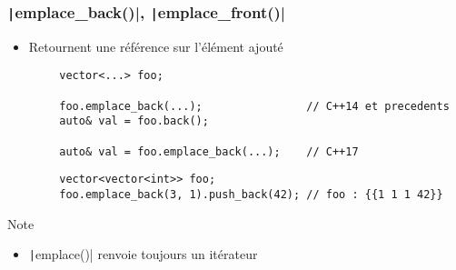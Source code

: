 \documentclass[C++.tex]{subfiles}
\begin{document}
\begin{frame}[fragile]
	\frametitle{\texttt|emplace_back()|, \texttt|emplace_front()|}
	\begin{itemize}
		\item Retournent une référence sur l'élément ajouté
	\end{itemize}

	\begin{verbatim}
		vector<...> foo;

		foo.emplace_back(...);                // C++14 et precedents
		auto& val = foo.back();

		auto& val = foo.emplace_back(...);    // C++17
	\end{verbatim}

	\begin{verbatim}
		vector<vector<int>> foo;
		foo.emplace_back(3, 1).push_back(42); // foo : {{1 1 1 42}}
	\end{verbatim}

	\begin{block}{Note}
		\begin{itemize}
			\item \texttt|emplace()| renvoie toujours un itérateur
		\end{itemize}
	\end{block}


\end{frame}
\end{document}

